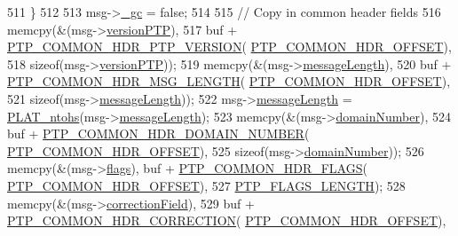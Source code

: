 \begin{DoxyCode}
{{{{{{{{{511     \}
512 
513     msg->\hyperlink{class_p_t_p_message_common_a1b15d1687680708819ead19f82a970a9}{\_gc} = \textcolor{keyword}{false};
514 
515     \textcolor{comment}{// Copy in common header fields}
516     memcpy(&(msg->\hyperlink{class_p_t_p_message_common_aebd1e0693c6170ff1b08b2471db92a80}{versionPTP}),
517            buf + \hyperlink{avbts__message_8hpp_a4b78a578ef002737321ef5c6def6593e}{PTP\_COMMON\_HDR\_PTP\_VERSION}(
      \hyperlink{avbts__message_8hpp_a330dd502b6e19949d74c8f3a96dd5667}{PTP\_COMMON\_HDR\_OFFSET}),
518            \textcolor{keyword}{sizeof}(msg->\hyperlink{class_p_t_p_message_common_aebd1e0693c6170ff1b08b2471db92a80}{versionPTP}));
519     memcpy(&(msg->\hyperlink{class_p_t_p_message_common_a6c490faee54bca860c4d897aae50990f}{messageLength}),
520            buf + \hyperlink{avbts__message_8hpp_a6db27d50a88956a08a99f2eb7b020247}{PTP\_COMMON\_HDR\_MSG\_LENGTH}(
      \hyperlink{avbts__message_8hpp_a330dd502b6e19949d74c8f3a96dd5667}{PTP\_COMMON\_HDR\_OFFSET}),
521            \textcolor{keyword}{sizeof}(msg->\hyperlink{class_p_t_p_message_common_a6c490faee54bca860c4d897aae50990f}{messageLength}));
522     msg->\hyperlink{class_p_t_p_message_common_a6c490faee54bca860c4d897aae50990f}{messageLength} = \hyperlink{linux_2src_2platform_8cpp_a6b8f3e7b87b66fa774a07ddc67f883a7}{PLAT\_ntohs}(msg->\hyperlink{class_p_t_p_message_common_a6c490faee54bca860c4d897aae50990f}{messageLength});
523     memcpy(&(msg->\hyperlink{class_p_t_p_message_common_a0443527ff087aecea2cac4f6e84d189c}{domainNumber}),
524            buf + \hyperlink{avbts__message_8hpp_aeba19234aadc9ec2ce3ec7b439a79c54}{PTP\_COMMON\_HDR\_DOMAIN\_NUMBER}(
      \hyperlink{avbts__message_8hpp_a330dd502b6e19949d74c8f3a96dd5667}{PTP\_COMMON\_HDR\_OFFSET}),
525            \textcolor{keyword}{sizeof}(msg->\hyperlink{class_p_t_p_message_common_a0443527ff087aecea2cac4f6e84d189c}{domainNumber}));
526     memcpy(&(msg->\hyperlink{class_p_t_p_message_common_a8c2f6104634deb80d932fa0cd9166fba}{flags}), buf + \hyperlink{avbts__message_8hpp_a60148b9c4d7f51e723a3ae8dd73e7851}{PTP\_COMMON\_HDR\_FLAGS}(
      \hyperlink{avbts__message_8hpp_a330dd502b6e19949d74c8f3a96dd5667}{PTP\_COMMON\_HDR\_OFFSET}),
527            \hyperlink{avbts__message_8hpp_ad8b20c17c21a3024f129fc556d5382c2}{PTP\_FLAGS\_LENGTH});
528     memcpy(&(msg->\hyperlink{class_p_t_p_message_common_a635b707dac6610b5b159be5c8ec1891e}{correctionField}),
529            buf + \hyperlink{avbts__message_8hpp_a86a729fd44989d68c1ebe5c385839743}{PTP\_COMMON\_HDR\_CORRECTION}(
      \hyperlink{avbts__message_8hpp_a330dd502b6e19949d74c8f3a96dd5667}{PTP\_COMMON\_HDR\_OFFSET}),
}}}}}}}}}
\end{DoxyCode}

